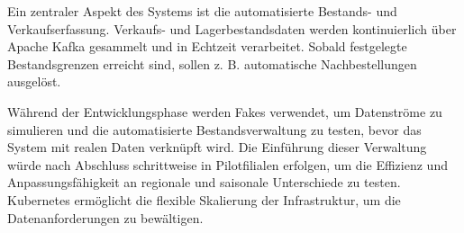\documentclass[%
pdftex,
oneside,			%
11pt,				%
parskip=half,		%
headheight = 12pt,	%
headsepline,		%
footsepline,		%
footheight = 16pt,	%
abstracton,		%
DIV=calc,		%
BCOR=8mm,		%
headinclude=false,	%
footinclude=false,	%
listof=totoc,		%
toc=bibliography,	%
]{scrreprt}	%
\begin{document}


    Ein zentraler Aspekt des Systems ist die automatisierte Bestands- und Verkaufserfassung.
    Verkaufs- und Lagerbestandsdaten werden kontinuierlich über Apache Kafka gesammelt und in Echtzeit verarbeitet.
    Sobald festgelegte Bestandsgrenzen erreicht sind, sollen z. B. automatische Nachbestellungen ausgelöst.

    Während der Entwicklungsphase werden Fakes verwendet, um Datenströme zu simulieren und die automatisierte Bestandsverwaltung zu testen, bevor das System mit realen Daten verknüpft wird.
    Die Einführung dieser Verwaltung würde nach Abschluss schrittweise in Pilotfilialen erfolgen, um die Effizienz und Anpassungsfähigkeit an regionale und saisonale Unterschiede zu testen.
    Kubernetes ermöglicht die flexible Skalierung der Infrastruktur, um die Datenanforderungen zu bewältigen.
\end{document}
